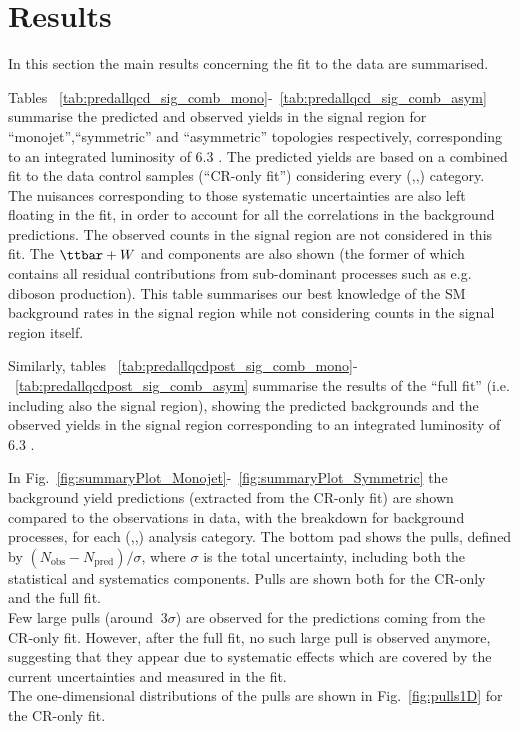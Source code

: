 \section{Results}
\label{sec:results}

In this section the main results concerning the fit to the data are summarised. 

Tables ~\ref{tab:predallqcd_sig_comb_mono}-~\ref{tab:predallqcd_sig_comb_asym} summarise 
the predicted and observed yields in the signal region 
for ``monojet'',``symmetric'' and ``asymmetric'' topologies respectively, 
corresponding to an integrated luminosity of 6.3 \ifb.
The predicted yields are based on a combined fit to the data control samples (``CR-only fit'') considering every (\nj,\nb,\scalht) category. 
The nuisances corresponding to those systematic uncertainties are also left floating in the fit, 
in order to account for all the correlations in the background predictions. 
The observed counts in the signal region are not considered in this fit. 
The $\ttbar+W$ and \znunu components are also shown (the former of which contains all residual contributions from sub-dominant processes such as e.g. diboson production). 
This table summarises our best knowledge of the SM background rates in the signal region while not considering counts in the signal region itself. 

Similarly, tables ~\ref{tab:predallqcdpost_sig_comb_mono}-~\ref{tab:predallqcdpost_sig_comb_asym} summarise the results of the ``full fit'' (i.e. including also the signal region), showing the predicted backgrounds and the observed yields in the signal region corresponding to an integrated luminosity of 6.3 \ifb. 

In Fig.~\ref{fig:summaryPlot_Monojet}-~\ref{fig:summaryPlot_Symmetric} the background yield predictions (extracted from the CR-only fit) 
are shown compared to the observations in data, with the breakdown for background processes, for each (\njet,\nb,\scalht) analysis category. 
The bottom pad shows the pulls, defined by $(N_{\mathrm{obs}}-N_{\mathrm{pred}})/\sigma$, where $\sigma$ is the total uncertainty, 
including both the statistical and systematics components. Pulls are shown both for the CR-only and the full fit. \\
Few large pulls (around $~3\sigma$) are observed for the predictions coming from the CR-only fit. 
However, after the full fit, no such large pull is observed anymore, suggesting that 
they appear due to systematic effects which are covered by the current uncertainties and measured in the fit. \\
The one-dimensional distributions of the pulls are shown in Fig.~\ref{fig:pulls1D} for the CR-only fit. 

